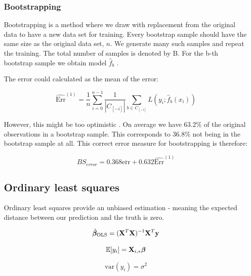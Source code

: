 \subsubsection{Bootstrapping}
Bootstrapping is a method where we draw with replacement from the original data to have a new data set for training. Every bootstrap sample should have the same size as the original data set, $n$. We generate many such samples and repeat the training. The total number of samples is denoted by B.
For the b-th bootstrap sample we obtain model $\hat{f}_b$ \citep[p. 249]{hastie}.

The error could calculated as the mean of the error:

\begin{equation}
    \widehat{\text{Err}}^{(1)} = \frac{1}{n} \sum_{i=0}^{n-1} \frac{1}{|C_{[-i]}|} \sum_{b \in C_{[-i]}} L\left(y_i; \hat{f}_b(x_i)\right)
\end{equation}

However, this might be too optimistic \citep[p. 251]{hastie}. On average we have 63.2\% of the original observations in a bootstrap sample. This corresponds to 36.8\% not being in the bootstrap sample at all.  This correct error measure for bootstrapping is therefore: 

\begin{equation}
    BS_{error} = 0.368 \overline{\text{err}} + 0.632 \widehat{\text{Err}}^{(1)}
\end{equation}


\subsection{Ordinary least squares}
Ordinary least squares provide an unbiased estimation - meaning the expected distance between our prediction and the truth is zero. 

\begin{equation}\label{betaols}
    \hat{\boldsymbol{\beta}}_{\text{OLS}} = (\mathbf{X}^T\mathbf{X})^{-1}\mathbf{X}^T\mathbf{y}
\end{equation}

\begin{equation}
    \mathbb{E}[y_i] = \mathbf{X}_{i,*}\boldsymbol{\beta}
\end{equation}

\begin{equation}
    \text{var}(y_i) = \sigma^2
\end{equation}

